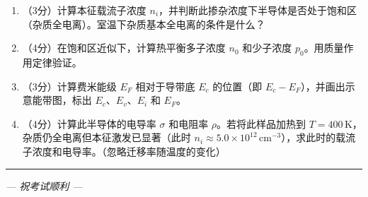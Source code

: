 \documentclass[12pt,a4paper]{ctexart}
\newcommand{\选择题}{\stepcounter{qcounter}\arabic{qcounter}.\,}
\newcommand{\填空题}{\stepcounter{qcounter}\arabic{qcounter}.\,}
\begin{document}
\begin{enumerate}[label=(\arabic*),nosep,leftmargin=0em]
\item （3分）计算本征载流子浓度 $n_i$，并判断此掺杂浓度下半导体是否处于饱和区（杂质全电离）。室温下杂质基本全电离的条件是什么？
\item （4分）在饱和区近似下，计算热平衡多子浓度 $n_0$ 和少子浓度 $p_0$。用质量作用定律验证。
\item （3分）计算费米能级 $E_F$ 相对于导带底 $E_c$ 的位置（即 $E_c - E_F$），并画出示意能带图，标出 $E_c$、$E_v$、$E_i$ 和 $E_F$。
\item （4分）计算此半导体的电导率 $\sigma$ 和电阻率 $\rho$。若将此样品加热到 $T = 400\,\text{K}$，杂质仍全电离但本征激发已显著（此时 $n_i \approx 5.0 \times 10^{12}\,\text{cm}^{-3}$），求此时的载流子浓度和电导率。（忽略迁移率随温度的变化）
\end{enumerate}

\vspace{18cm}

\hrule
\vspace{8pt}

\begin{center}
\textit{--- 祝考试顺利 ---}
\end{center}
\end{document}

